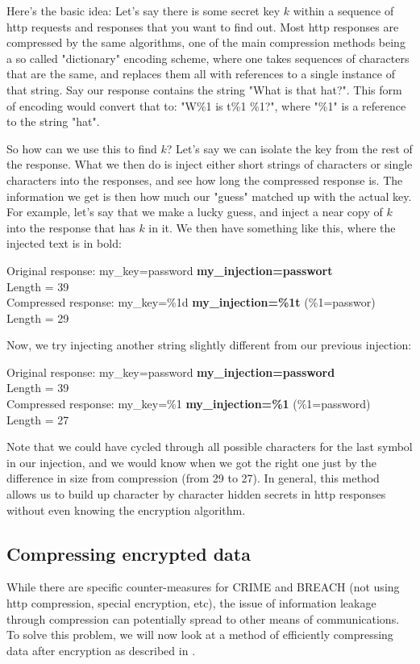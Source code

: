\documentclass[11pt]{article}
\begin{document}
Here's the basic idea: 
Let's say there is some secret key $k$ within a sequence of http requests and responses that 
you want to find out. Most http responses are compressed by the same algorithms, one of the 
main compression methods being a so called "dictionary" encoding scheme, where one takes sequences 
of characters that are the same, and replaces them all with references to a single instance of that string. 
Say our response contains the string "What is that hat?". This form of encoding would convert that to: 
"W\%1 is t\%1 \%1?", where "\%1" is a reference to the string "hat". 

So how can we use this to find $k$? Let's say we can isolate the key from the rest of the response. 
What we then do is inject either short strings of characters or single characters into the responses, and see how long 
the compressed response is. The information we get is then how much our "guess" matched up with the actual key. 
For example, let's say that we make a lucky guess, and inject a near copy of $k$ into the response that has $k$ in it. 
We then have something like this, where the injected text is in bold:
\begin{center}
	Original response: my\_key=password \textbf{my\_injection=passwort}\\
	Length = 39\\
	Compressed response: my\_key=\%1d \textbf{my\_injection=\%1t} (\%1=passwor)\\
	Length = 29\\
\end{center}
Now, we try injecting another string slightly different from our previous injection:
\begin{center}
	Original response: my\_key=password \textbf{my\_injection=password}\\
	Length = 39\\
	Compressed response: my\_key=\%1 \textbf{my\_injection=\%1} (\%1=password)\\
	Length = 27\\
\end{center}
Note that we could have cycled through all possible characters for the last symbol in our injection, 
and we would know when we got the right one just by the difference in size from compression (from 29 to 27). 
In general, this method allows us to build up character by character hidden secrets in http responses 
without even knowing the encryption algorithm. 

\subsection{Compressing encrypted data}\label{compress-encrypt-subsect}
While there are specific counter-measures for CRIME and BREACH (not using http compression, special encryption, etc), 
the issue of information leakage through compression can potentially spread to other means of communications. 
To solve this problem, we will now look at a method of efficiently compressing data after encryption as described in \cite{johnson}. 
\end{document}
